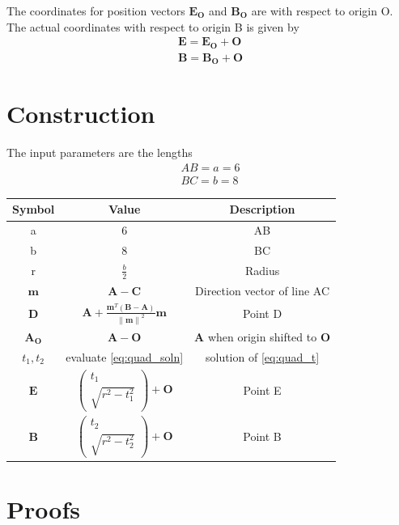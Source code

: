 \documentclass[journal,10pt,twocolumn]{article}
\providecommand{\norm}[1]{\left\lVert#1\right\rVert}
\let\vec\mathbf
\newcommand{\myvec}[1]{\ensuremath{\begin{pmatrix}#1\end{pmatrix}}}
\begin{document}
The coordinates for position vectors $\vec{E_O}$ and $\vec{B_O}$ are with respect to origin O. The actual coordinates with respect to origin B is given by 
\begin{eqnarray}
	\vec{E} = \vec{E_O} + \vec{O}\\
	\vec{B} = \vec{B_O} + \vec{O}
\end{eqnarray}

\section*{\large Construction}
The input parameters are the lengths
\begin{eqnarray*}
	AB = a = 6\\
	BC = b = 8
\end{eqnarray*}
{
\setlength\extrarowheight{5pt}
\begin{tabular}{|c|c|c|}
	\hline
	\textbf{Symbol}&\textbf{Value}&\textbf{Description}\\
	\hline
	a&6&AB\\
	\hline
	b&8&BC\\
	\hline
	r&$\frac{b}{2}$&Radius\\
	\hline
	$\vec{m}$&$\vec{A-C}$&Direction vector of line AC\\
	\hline
	$\vec{D}$&$\vec{A} + \frac{\vec{m}^T(\vec{B-A})}{\norm{\vec{m}}^2}\vec{m}$&Point D\\[5pt]
	\hline
	$\vec{A_O}$&$\vec{A-O}$&$\vec{A}$ when origin shifted to $\vec{O}$\\
	\hline
	$t_1,t_2$&evaluate \eqref{eq:quad_soln}&solution of \eqref{eq:quad_t}\\[5pt] 
	\hline
	$\vec{E}$&$\myvec{t_1 \\ \sqrt{r^2-t_1^2}}+\vec{O}$&Point E\\[5pt]
	\hline
	$\vec{B}$&$\myvec{t_2 \\ \sqrt{r^2-t_2^2}}+\vec{O}$&Point B\\[5pt]
	\hline
\end{tabular}
}

\section*{\large Proofs}
\end{document}
